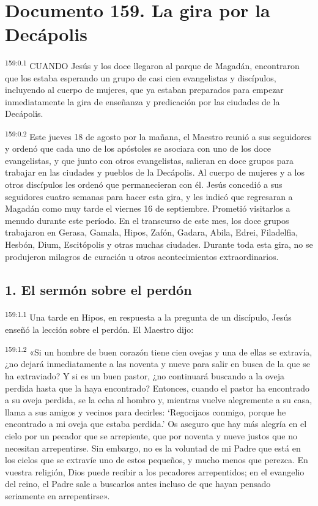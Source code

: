 \chapter{Documento 159. La gira por la Decápolis}
\par 
\textsuperscript{159:0.1} CUANDO Jesús y los doce llegaron al parque de Magadán, encontraron que los estaba esperando un grupo de casi cien evangelistas y discípulos, incluyendo al cuerpo de mujeres, que ya estaban preparados para empezar inmediatamente la gira de enseñanza y predicación por las ciudades de la Decápolis.

\par 
\textsuperscript{159:0.2} Este jueves 18 de agosto por la mañana, el Maestro reunió a sus seguidores y ordenó que cada uno de los apóstoles se asociara con uno de los doce evangelistas, y que junto con otros evangelistas, salieran en doce grupos para trabajar en las ciudades y pueblos de la Decápolis. Al cuerpo de mujeres y a los otros discípulos les ordenó que permanecieran con él. Jesús concedió a sus seguidores cuatro semanas para hacer esta gira, y les indicó que regresaran a Magadán como muy tarde el viernes 16 de septiembre. Prometió visitarlos a menudo durante este período. En el transcurso de este mes, los doce grupos trabajaron en Gerasa, Gamala, Hipos, Zafón, Gadara, Abila, Edrei, Filadelfia, Hesbón, Dium, Escitópolis y otras muchas ciudades. Durante toda esta gira, no se produjeron milagros de curación u otros acontecimientos extraordinarios.

\section*{1. El sermón sobre el perdón}
\par 
\textsuperscript{159:1.1} Una tarde en Hipos, en respuesta a la pregunta de un discípulo, Jesús enseñó la lección sobre el perdón. El Maestro dijo:

\par 
\textsuperscript{159:1.2} «Si un hombre de buen corazón tiene cien ovejas y una de ellas se extravía, ¿no dejará inmediatamente a las noventa y nueve para salir en busca de la que se ha extraviado? Y si es un buen pastor, ¿no continuará buscando a la oveja perdida hasta que la haya encontrado? Entonces, cuando el pastor ha encontrado a su oveja perdida, se la echa al hombro y, mientras vuelve alegremente a su casa, llama a sus amigos y vecinos para decirles: `Regocijaos conmigo, porque he encontrado a mi oveja que estaba perdida.' Os aseguro que hay más alegría en el cielo por un pecador que se arrepiente, que por noventa y nueve justos que no necesitan arrepentirse. Sin embargo, no es la voluntad de mi Padre que está en los cielos que se extravíe uno de estos pequeños, y mucho menos que perezca. En vuestra religión, Dios puede recibir a los pecadores arrepentidos; en el evangelio del reino, el Padre sale a buscarlos antes incluso de que hayan pensado seriamente en arrepentirse».

